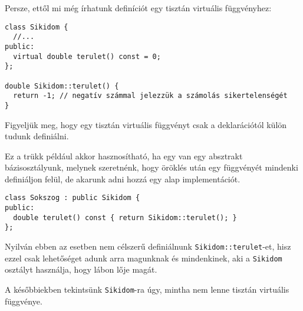 \documentclass[../cpp_book/cpp_book.tex]{subfiles}
\begin{document}
	Persze, ettől mi még írhatunk definíciót egy tisztán virtuális függvényhez:
\begin{lstlisting}
class Sikidom {
  //...
public:
  virtual double terulet() const = 0;
};

double Sikidom::terulet() {
  return -1; // negatív számmal jelezzük a számolás sikertelenségét
}
\end{lstlisting}
	Figyeljük meg, hogy egy tisztán virtuális függvényt csak a deklarációtól külön tudunk definiálni. 
	
	Ez a trükk például akkor hasznosítható, ha egy van egy absztrakt bázisosztályunk, melynek szeretnénk, hogy öröklés után egy függvényét mindenki definiáljon felül, de akarunk adni hozzá egy alap implementációt.
\begin{lstlisting}
class Sokszog : public Sikidom {
public:
  double terulet() const { return Sikidom::terulet(); }
};
\end{lstlisting}
	\begin{note}
		Nyilván ebben az esetben nem célszerű definiálnunk \texttt{Sikidom::terulet}-et, hisz ezzel csak lehetőséget adunk arra magunknak és mindenkinek, aki a \texttt{Sikidom} osztályt használja, hogy lábon lője magát.
	\end{note}
	A későbbiekben tekintsünk \texttt{Sikidom}-ra úgy, mintha nem lenne tisztán virtuális függvénye.
\end{document}
